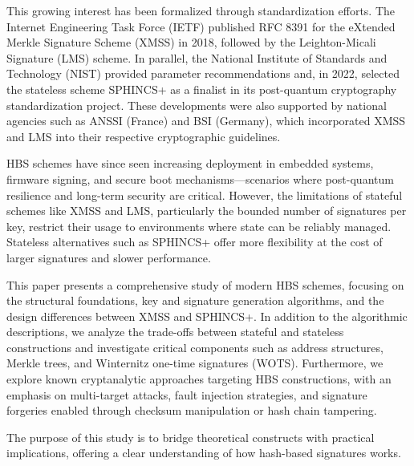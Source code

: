 \documentclass [version=submission]{iacrcc}
\begin{document}
This growing interest has been formalized through standardization efforts. The Internet Engineering Task Force (IETF) published RFC 8391 for the eXtended Merkle Signature Scheme (XMSS) in 2018, followed by the Leighton-Micali Signature (LMS) scheme. In parallel, the National Institute of Standards and Technology (NIST) provided parameter recommendations and, in 2022, selected the stateless scheme SPHINCS+ as a finalist in its post-quantum cryptography standardization project. These developments were also supported by national agencies such as ANSSI (France) and BSI (Germany), which incorporated XMSS and LMS into their respective cryptographic guidelines.

HBS schemes have since seen increasing deployment in embedded systems, firmware signing, and secure boot mechanisms—scenarios where post-quantum resilience and long-term security are critical. However, the limitations of stateful schemes like XMSS and LMS, particularly the bounded number of signatures per key, restrict their usage to environments where state can be reliably managed. Stateless alternatives such as SPHINCS+ offer more flexibility at the cost of larger signatures and slower performance.

This paper presents a comprehensive study of modern HBS schemes, focusing on the structural foundations, key and signature generation algorithms, and the design differences between XMSS and SPHINCS+. In addition to the algorithmic descriptions, we analyze the trade-offs between stateful and stateless constructions and investigate critical components such as address structures, Merkle trees, and Winternitz one-time signatures (WOTS). Furthermore, we explore known cryptanalytic approaches targeting HBS constructions, with an emphasis on multi-target attacks, fault injection strategies, and signature forgeries enabled through checksum manipulation or hash chain tampering.

The purpose of this study is to bridge theoretical constructs with practical implications, offering a clear understanding of how hash-based signatures works.
\end{document}
